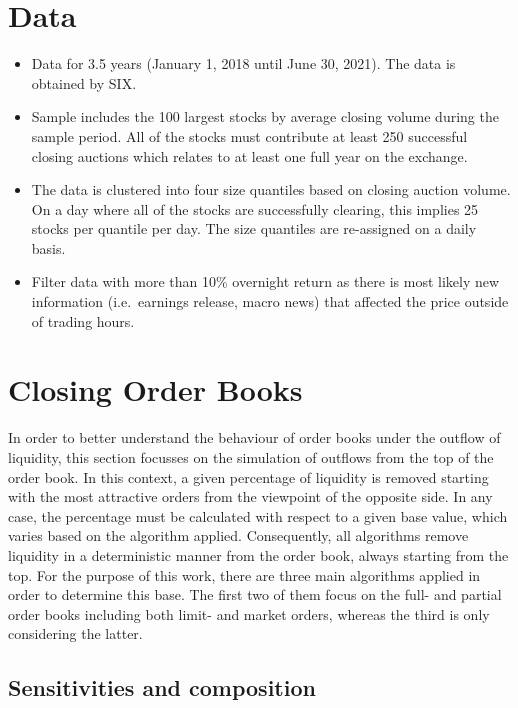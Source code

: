 \documentclass[11pt,a4paper]{article}
\begin{document}
    \section{Data} \label{sec:Data}
    \begin{itemize}
        \item Data for 3.5 years (January 1, 2018 until June 30, 2021). The data is obtained by \acf{SIX}.
        \item Sample includes the 100 largest stocks by average closing volume during the sample period. All of the stocks must contribute at least 250 successful closing auctions which relates to at least one full year on the exchange.
        \item The data is clustered into four size quantiles based on closing auction volume. On a day where all of the stocks are successfully clearing, this implies 25 stocks per quantile per day. The size quantiles are re-assigned on a daily basis.
        \item Filter data with more than 10\% overnight return as there is most likely new information (i.e.\ earnings release, macro news) that affected the price outside of trading hours.
    \end{itemize}


    \section{Closing Order Books} \label{sec:ClosingBooks}

    In order to better understand the behaviour of order books under the outflow of liquidity, this section focusses on the simulation of outflows from the top of the order book. In this context, a given percentage of liquidity is removed starting with the most attractive orders from the viewpoint of the opposite side. In any case, the percentage must be calculated with respect to a given base value, which varies based on the algorithm applied. Consequently, all algorithms remove liquidity in a deterministic manner from the order book, always starting from the top. For the purpose of this work, there are three main algorithms applied in order to determine this base. The first two of them focus on the full- and partial order books including both limit- and market orders, whereas the third is only considering the latter.

    \subsection{Sensitivities and composition}
\end{document}
